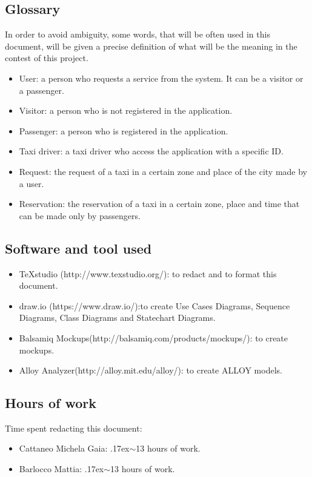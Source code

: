\documentclass[18pt,oneside,a4paper, titlepage]{article}
\begin{document}
	\subsection{Glossary}
		In order to avoid ambiguity, some words, that will be often used in this document, will be given a precise definition of what will be the meaning in the contest of this project.
		\begin{itemize}
			\item User: a person who requests a service from the system. It can be a visitor or a passenger.
			\item Visitor: a person who is not registered in the application.
			\item Passenger: a person who is registered in the application.
			\item Taxi driver: a taxi driver who access the application with a specific ID.
			\item Request: the request of a taxi in a certain zone and place of the city made by a user.
			\item Reservation: the reservation of a taxi in a certain zone, place and time that can be made only by passengers.
	\end{itemize}
	\subsection{Software and tool used}
		\begin{itemize}
			\item TeXstudio (http://www.texstudio.org/): to redact and to format this document.
			\item draw.io (https://www.draw.io/):to create Use
			Cases Diagrams, Sequence Diagrams, Class Diagrams and Statechart
			Diagrams.
			\item Balsamiq Mockups(http://balsamiq.com/products/mockups/): to create mockups.
			\item Alloy Analyzer(http://alloy.mit.edu/alloy/): to create ALLOY models.
		\end{itemize}
	
	\subsection{Hours of work}
		Time spent redacting this document:
		\begin{itemize}
			\item Cattaneo Michela Gaia: {\raise.17ex\hbox{$\scriptstyle\sim$}}13 hours of work.
			\item Barlocco Mattia: {\raise.17ex\hbox{$\scriptstyle\sim$}}13 hours of work.
		\end{itemize}
\end{document}
